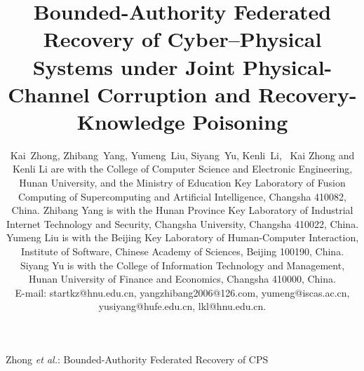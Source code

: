 \title{Bounded-Authority Federated Recovery of Cyber--Physical Systems under Joint Physical-Channel Corruption and Recovery-Knowledge Poisoning}

\author{
        Kai~Zhong,
        Zhibang~Yang,
        Yumeng~Liu,
        Siyang~Yu,
        Kenli~Li,~
\IEEEcompsocitemizethanks
{
\IEEEcompsocthanksitem Kai Zhong and Kenli Li are with the College of Computer Science and Electronic Engineering, Hunan University, and the Ministry of Education Key Laboratory of Fusion Computing of Supercomputing and Artificial Intelligence, Changsha 410082, China.
\IEEEcompsocthanksitem Zhibang Yang is with the Hunan Province Key Laboratory of Industrial Internet Technology and Security, Changsha University, Changsha 410022, China.
\IEEEcompsocthanksitem Yumeng Liu is with the Beijing Key Laboratory of Human-Computer Interaction, Institute of Software, Chinese Academy of Sciences, Beijing 100190, China.
\IEEEcompsocthanksitem Siyang Yu is with the College of Information Technology and Management, Hunan University of Finance and Economics, Changsha 410000, China.
\protect\\ E-mail: startkz@hnu.edu.cn, yangzhibang2006@126.com, yumeng@iscas.ac.cn, yusiyang@hufe.edu.cn, lkl@hnu.edu.cn.
}
}

%
{Zhong \MakeLowercase{\textit{et al.}}: Bounded-Authority Federated Recovery of CPS}

